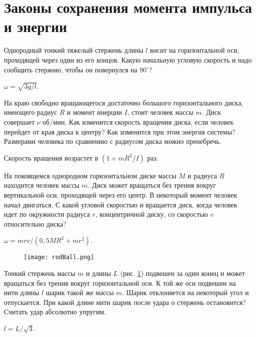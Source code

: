 \section{Законы сохранения момента импульса и энергии}

\begin{ex} %
Однородный тонкий тяжелый стержень длины $l$ висит на горизонтальной оси, проходящей через один из его концов. Какую начальную угловую скорость и надо сообщить стержню, чтобы он повернулся на $90^{\circ}$?
\begin{ans}
$\omega = \sqrt{3g/l}$.
\end{ans}
\end{ex}	

\begin{ex} %
На краю свободно вращающегося достаточно большого горизонтального диска, имеющего радиус $R$ и момент инерции $I$, стоит человек массы $m$. Диск совершает $\nu$ об/мин. Как изменится скорость вращения диска, если человек перейдет от края диска к центру? Как изменится при этом энергия системы? Размерами человека по сравнению с радиусом диска можно пренебречь.
\begin{ans}
Скорость вращения возрастет в $(1+mR^2/I)$ раз.
\end{ans}
\end{ex}	

\begin{ex} %
На покоящемся однородном горизонтальном диске массы $M$ и радиуса $R$ находится человек массы $m$. Диск может вращаться без трения вокруг вертикальной оси, проходящей через его центр. В некоторый момент человек начал двигаться. С какой угловой скоростью и вращается диск, когда человек идет по окружности радиуса $r$, концентричной диску, со скоростью $v$ относительно диска?
\begin{ans}
$\omega = mrv/(0,5MR^2 + mr^2)$.
\end{ans}
\end{ex}	

\begin{figure}[h]
\centering
\texttt{[image: rodBall.png]}
\caption{}
\label{rodBall}
\end{figure}

\begin{ex} %
Тонкий стержень массы $m$ и длины $L$ (рис. \ref{rodBall}) подвешен за один конец и может вращаться без трения вокруг горизонтальной оси. К той же оси подвешен на нити длины $l$ шарик такой же массы $m$. Шарик отклоняется на некоторый угол и отпускается. При какой длине нити шарик после удара о стержень остановится? Считать удар абсолютно упругим.
\begin{ans}
$l = L/\sqrt{3}$.
\end{ans}
\end{ex}	

